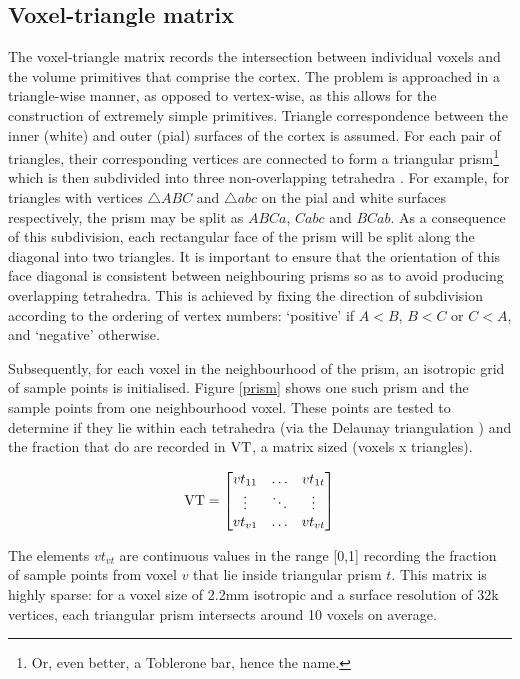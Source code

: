 \subsection{Voxel-triangle matrix}
The voxel-triangle matrix records the intersection between individual voxels and the volume primitives that comprise the cortex. The problem is approached in a triangle-wise manner, as opposed to vertex-wise, as this allows for the construction of extremely simple primitives. Triangle correspondence between the inner (white) and outer (pial) surfaces of the cortex is assumed. For each pair of triangles, their corresponding vertices are connected to form a triangular prism\footnote{Or, even better, a Toblerone bar, hence the name.} which is then subdivided into three non-overlapping tetrahedra \cite{Dompierre1999}. For example, for triangles with vertices $\triangle ABC$ and $\triangle abc$ on the pial and white surfaces respectively, the prism may be split as $ABCa$, $Cabc$ and $BCab$. As a consequence of this subdivision, each rectangular face of the prism will be split along the diagonal into two triangles. It is important to ensure that the orientation of this face diagonal is consistent between neighbouring prisms so as to avoid producing overlapping tetrahedra. This is achieved by fixing the direction of subdivision according to the ordering of vertex numbers: `positive' if $A < B$, $B < C$ or $C < A$, and `negative' otherwise. 

Subsequently, for each voxel in the neighbourhood of the prism, an isotropic grid of sample points is initialised. Figure \ref{prism} shows one such prism and the sample points from one neighbourhood voxel. These points are tested to determine if they lie within each tetrahedra (via the Delaunay triangulation \cite{Barber:1996:QAC:235815.235821}) and the fraction that do are recorded in $\mathrm{VT}$, a matrix sized (voxels x triangles). 

\begin{equation}
\mathrm{VT} = 
\begin{bmatrix}
vt_{11} & \ldots & vt_{1t} \\
\vdots & \ddots & \vdots \\
vt_{v1} & \ldots & vt_{vt}
\end{bmatrix}
\end{equation}

The elements $vt_{vt}$ are continuous values in the range [0,1] recording the fraction of sample points from voxel $v$ that lie inside triangular prism $t$. This matrix is highly sparse: for a voxel size of 2.2mm isotropic and a surface resolution of 32k vertices, each triangular prism intersects around 10 voxels on average.

